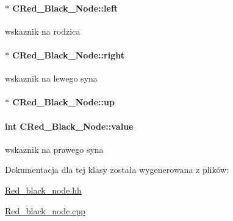 \paragraph[{left}]{$\ast$ C\+Red\+\_\+\+Black\+\_\+\+Node\+::left\hspace{0.3cm}{\ttfamily [private]}}\label{class_c_red___black___node_a1fa5a456940cae743b695a911b453a9e}
wskaznik na rodzica \hypertarget{class_c_red___black___node_ad78478582f0ed7aacf4760f6b702a8a3}{}
\paragraph[{right}]{$\ast$ C\+Red\+\_\+\+Black\+\_\+\+Node\+::right\hspace{0.3cm}{\ttfamily [private]}}\label{class_c_red___black___node_ad78478582f0ed7aacf4760f6b702a8a3}
wskaznik na lewego syna \hypertarget{class_c_red___black___node_a9f94874dfcfe5827c5f9ceb1069b4625}{}
\paragraph[{up}]{$\ast$ C\+Red\+\_\+\+Black\+\_\+\+Node\+::up\hspace{0.3cm}{\ttfamily [private]}}\label{class_c_red___black___node_a9f94874dfcfe5827c5f9ceb1069b4625}
\hypertarget{class_c_red___black___node_a3dd4ce06e4cbf460cd9a023b94b3751b}{}
\paragraph[{value}]{\setlength{\rightskip}{0pt plus 5cm}int C\+Red\+\_\+\+Black\+\_\+\+Node\+::value\hspace{0.3cm}{\ttfamily [private]}}\label{class_c_red___black___node_a3dd4ce06e4cbf460cd9a023b94b3751b}
wskaznik na prawego syna 

Dokumentacja dla tej klasy została wygenerowana z plików\+:\begin{DoxyCompactItemize}
\item 
\hyperlink{_red__black__node_8hh}{Red\+\_\+black\+\_\+node.\+hh}\item 
\hyperlink{_red__black__node_8cpp}{Red\+\_\+black\+\_\+node.\+cpp}\end{DoxyCompactItemize}
